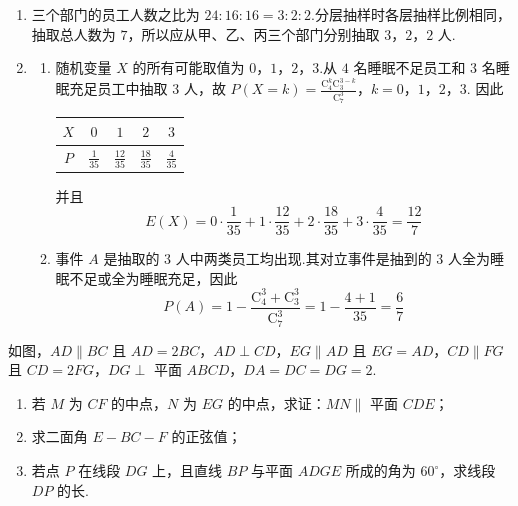 \begin{solution}
\begin{enumerate}
\item 三个部门的员工人数之比为 \(24:16:16=3:2:2\).分层抽样时各层抽样比例相同，抽取总人数为 \(7\)，所以应从甲、乙、丙三个部门分别抽取 \(3\)，\(2\)，\(2\) 人.
\item
\begin{enumerate}
\item 随机变量 \(X\) 的所有可能取值为 \(0\)，\(1\)，\(2\)，\(3\).从 \(4\) 名睡眠不足员工和 \(3\) 名睡眠充足员工中抽取 \(3\) 人，故
\(P(X=k)=\frac{\mathrm C_4^k\mathrm C_3^{3-k}}{\mathrm C_7^3}\)，\(k=0\)，\(1\)，\(2\)，\(3\).
因此
\begin{center}
\begin{tabular}{c|cccc}
\(X\)&\(0\)&\(1\)&\(2\)&\(3\)\\ \hline
\(P\)&\(\frac1{35}\)&\(\frac{12}{35}\)&\(\frac{18}{35}\)&\(\frac4{35}\)
\end{tabular}
\end{center}
并且
\[
E(X)=0\cdot\frac1{35}+1\cdot\frac{12}{35}
+2\cdot\frac{18}{35}+3\cdot\frac4{35}
=\frac{12}{7}
\]

\item 事件 \(A\) 是抽取的 \(3\) 人中两类员工均出现.其对立事件是抽到的 \(3\) 人全为睡眠不足或全为睡眠充足，因此
\[
P(A)=1-\frac{\mathrm C_4^3+\mathrm C_3^3}{\mathrm C_7^3}
=1-\frac{4+1}{35}
=\frac67
\]
\end{enumerate}
\end{enumerate}
\end{solution}

\begin{problem}

如图，\(AD\parallel BC\) 且 \(AD=2BC\)，\(AD\perp CD\)，\(EG\parallel AD\) 且 \(EG=AD\)，\(CD\parallel FG\) 且 \(CD=2FG\)，\(DG\perp\) 平面 \(ABCD\)，\(DA=DC=DG=2\).

\begin{enumerate}
\item 若 \(M\) 为 \(CF\) 的中点，\(N\) 为 \(EG\) 的中点，求证：\(MN\parallel\) 平面 \(CDE\)；
\item 求二面角 \(E-BC-F\) 的正弦值；
\item 若点 \(P\) 在线段 \(DG\) 上，且直线 \(BP\) 与平面 \(ADGE\) 所成的角为 \(60^\circ\)，求线段 \(DP\) 的长.
\end{enumerate}

\end{problem}

